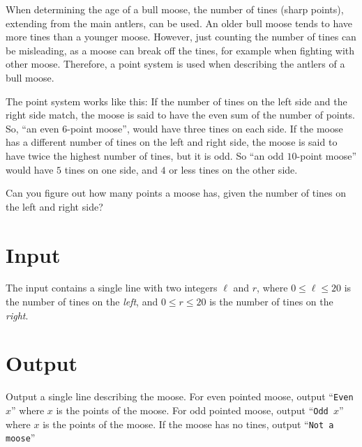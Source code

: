 
%
\noindent
When determining the age of a bull moose, the number of tines (sharp points),
extending from the main antlers, can be used. An older bull moose tends to have
more tines than a younger moose. However, just counting the number of tines
can be misleading, as a moose can break off the tines, for example when fighting
with other moose. Therefore, a point system is used when describing the antlers
of a bull moose.

The point system works like this: If the number of tines on the left side and the
right side match, the moose is said to have the even sum of the number of points.
So, ``an even $6$-point moose'', would have three tines on each side.  If the moose
has a different number of tines on the left and right side, the moose is said to
have twice the highest number of tines, but it is odd. So ``an odd $10$-point moose''
would have $5$ tines on one side, and $4$ or less tines on the other side.

Can you figure out how many points a moose has, given the number of tines
on the left and right side?

\section*{Input}

The input contains a single line with two integers $\ell$ and $r$, where $0 \le \ell \le 20$ is the number of tines on the \emph{left}, and $0 \le r \le 20$ is the number of tines on the \emph{right}.

\section*{Output}

Output a single line describing the moose.
For even pointed moose, output ``\texttt{Even $x$}'' where $x$ is the points of the
moose.
%
For odd pointed moose, output ``\texttt{Odd $x$}'' where $x$ is the points of the
moose.
%
If the moose has no tines, output ``\texttt{Not a moose}''
